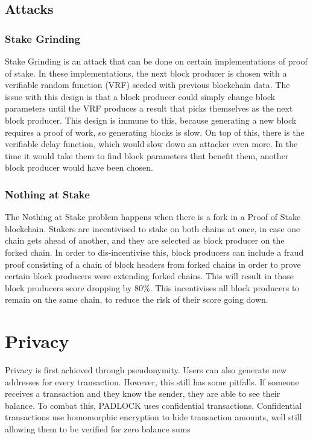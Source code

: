 \documentclass[12pt, letterpaper]{article}
\begin{document}
\subsection{Attacks}

\subsubsection{Stake Grinding}
Stake Grinding is an attack that can be done on certain implementations of proof
of stake. In these implementations, the next block producer is chosen with a
verifiable random function (VRF) seeded with previous blockchain data. The issue
with this design is that a block producer could simply change block parameters
until the VRF produces a result that picks themselves as the next block
producer. This design is immune to this, because generating a new block requires
a proof of work, so generating blocks is slow. On top of this, there is the
verifiable delay function, which would slow down an attacker even more. In the
time it would take them to find block parameters that benefit them, another
block producer would have been chosen.

\subsubsection{Nothing at Stake}
The Nothing at Stake problem happens when there is a fork in a Proof of Stake
blockchain. Stakers are incentivised to stake on both chains at once, in case
one chain gets ahead of another, and they are selected as block producer on the
forked chain. In order to dis-incentivise this, block producers can include a
fraud proof consisting of a chain of block headers from forked chains in order
to prove certain block producers were extending forked chains. This will result
in those block producers score dropping by 80\%. This incentivises all block
producers to remain on the same chain, to reduce the risk of their score going
down.

\section{Privacy}
Privacy is first achieved through pseudonymity. Users can also generate new
addresses for every transaction. However, this still has some pitfalls. If
someone receives a transaction and they know the sender, they are able to see
their balance. To combat this, PADLOCK uses confidential transactions.
Confidential transactions use homomorphic encryption to hide transaction
amounts, well still allowing them to be verified for zero balance sums
\cite{CT}
\end{document}
